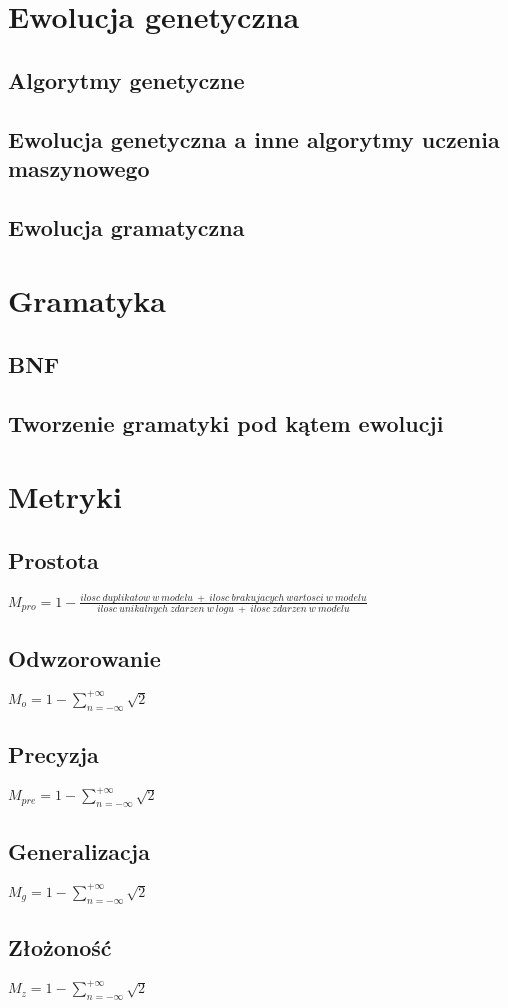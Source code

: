 \section{Ewolucja genetyczna}
\label{sec:ewolucjaGenetyczne}
\subsection{Algorytmy genetyczne}
\cite{10.5555/138936}
\subsection{Ewolucja genetyczna a inne algorytmy uczenia maszynowego}
\subsection{Ewolucja gramatyczna}


\section{Gramatyka}
\label{sec:gramatyka}
\subsection{BNF}
\subsection{Tworzenie gramatyki pod kątem ewolucji}


\section{Metryki}
\label{sec:metryki}
\cite{doi:10.1142/S0218843014400012}
\subsection{Prostota}
$M_{pro} = 1 - \frac{ilosc\ duplikatow\ w\ modelu\ +\ ilosc\ brakujacych\ wartosci\ w\ modelu}{ilosc\ unikalnych\ zdarzen\ w\ logu\ +\ ilosc\ zdarzen\ w\ modelu}$
\subsection{Odwzorowanie}
$M_o = 1 - \sum_{n=-\infty}^{+\infty} \sqrt{2} $
\subsection{Precyzja}
$M_{pre} = 1 - \sum_{n=-\infty}^{+\infty} \sqrt{2} $
\subsection{Generalizacja}
$M_g = 1 - \sum_{n=-\infty}^{+\infty} \sqrt{2} $
\subsection{Złożoność}
$M_z = 1 - \sum_{n=-\infty}^{+\infty} \sqrt{2} $
